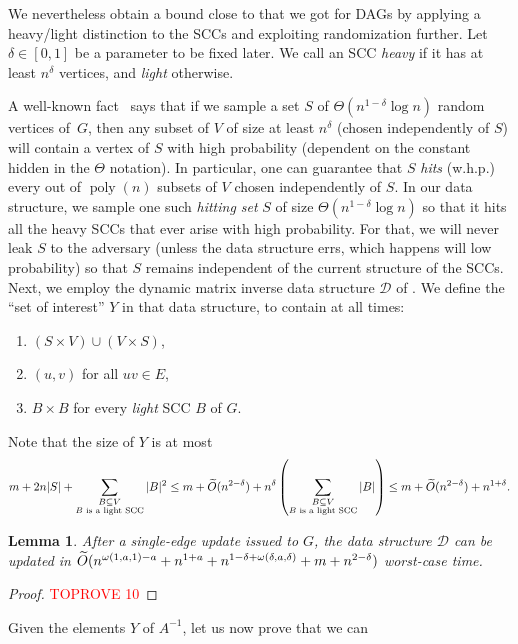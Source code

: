 \documentclass[11pt]{article}
\newtheorem{lemma}[theorem]{Lemma}
\newcommand{\poly}[1]{\ensuremath{\operatorname{poly}\left( #1 \right)}\xspace}
\newcommand{\B}[1]{\textrm{{\normalfont B}\( ^{ #1 } \)}\xspace}
\begin{document}
{We nevertheless obtain a bound close to that we got for DAGs by applying a heavy/light distinction to the SCCs and exploiting randomization further.
Let $\delta\in [0,1]$ be a parameter to be fixed later.
We call an SCC \emph{heavy} if it has at least $n^\delta$ vertices,
and \emph{light} otherwise.

A well-known fact~\cite{UY91} says
that if we sample a set $S$ of $\Theta(n^{1-\delta}\log{n})$ random vertices of~$G$, then any
subset of $V$ of size at least $n^\delta$ (chosen independently of $S$) will contain
a vertex of $S$ with high probability (dependent on the constant hidden in the $\Theta$ notation). 
In particular, one can guarantee
that $S$ \emph{hits} (w.h.p.) every
out of $\poly{n}$ subsets of $V$
chosen independently of $S$.
In our data structure, 
we sample one such \emph{hitting set} $S$ of
size $\Theta(n^{1-\delta}\log{n})$
so that it hits all the heavy SCCs
that ever arise with high probability. For that, we will never leak $S$ to the adversary (unless the data structure errs, which happens will low probability) so that $S$ remains independent of the current structure of the SCCs.
Next, we employ the dynamic matrix inverse data structure $\mathcal{D}$ of . We define the ``set of interest'' $Y$ in that data structure, to contain at all times:
\begin{enumerate}
\item $(S\times V)\cup (V\times S)$,
\item $(u,v)$ for all $uv\in E$,
\item $B\times B$ for every \emph{light} SCC $B$ of $G$.
\end{enumerate}
Note that the size of $Y$ is at most
\begin{equation*}
m+2n|S|+\sum_{\substack{B\subseteq V\\B\text{ is a light SCC}}}|B|^2\leq m+
\widetilde{O}(n^{2-\delta})+n^\delta\left(\sum_{\substack{B\subseteq V\\B\text{ is a light SCC}}}|B|\right)\leq m+\widetilde{O}(n^{2-\delta})+n^{1+\delta}.
\end{equation*}
\begin{lemma}
    After a single-edge update issued to $G$, the data structure $\mathcal{D}$ can be updated in $\widetilde{O}(n^{\omega(1,a,1)-a}+n^{1+a}+n^{1-\delta+\omega(\delta,a,\delta)}+m+n^{2-\delta})$
    worst-case time.
\end{lemma}
\begin{proof}\textcolor{red}{TOPROVE 10}\end{proof}
Given the elements $Y$ of $A^{-1}$, let us now prove that we can 
}
\end{document}
